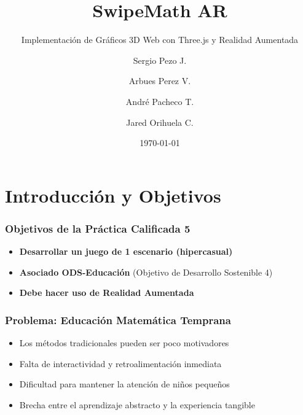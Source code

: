 \documentclass{beamer}
\title{SwipeMath AR}
\subtitle{Implementación de Gráficos 3D Web con Three.js y Realidad Aumentada}
\author{Sergio Pezo J. \and Arbues Perez V. \and André Pacheco T. \and Jared Orihuela C.}
\date{\today}
\begin{document}
\maketitle

\section{Introducción y Objetivos}

\begin{frame}
\frametitle{Objetivos de la Práctica Calificada 5}
\begin{itemize}
    \item<1-> \textbf{Desarrollar un juego de 1 escenario (hipercasual)}
    \item<2-> \textbf{Asociado ODS-Educación} (Objetivo de Desarrollo Sostenible 4)
    \item<3-> \textbf{Debe hacer uso de Realidad Aumentada}
\end{itemize}

\end{frame}

\begin{frame}
\frametitle{Problema: Educación Matemática Temprana}
\begin{itemize}
    \item<1-> Los métodos tradicionales pueden ser poco motivadores
    \item<2-> Falta de interactividad y retroalimentación inmediata
    \item<3-> Dificultad para mantener la atención de niños pequeños
    \item<4-> Brecha entre el aprendizaje abstracto y la experiencia tangible
\end{itemize}

\end{frame}
\end{document}
